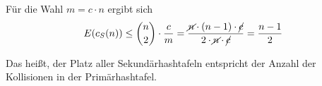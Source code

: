 \documentclass{scrartcl}%
\begin{document}
    Für die Wahl $m=c \cdot n$ ergibt sich
    \begin{equation*}
        E(c_S(n)) \leq \binom{n}{2} \cdot \frac{c}{m} = \frac{\cancel{n} \cdot (n-1) \cdot \cancel{c}}{2 \cdot \cancel{n} \cdot \cancel{c}} = \frac{n-1}{2}
    \end{equation*}

    Das heißt, der Platz aller Sekundärhashtafeln entspricht der Anzahl der Kollisionen in der Primärhashtafel.
\end{document}
